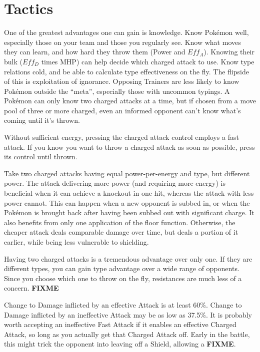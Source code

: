 \chapter{Tactics}
\label{chap:strategy}
One of the greatest advantages one can gain is knowledge.
Know Pokémon well, especially those on your team and those you regularly see.
Know what moves they can learn, and how hard they throw them (Power and $Eff_A$).
Knowing their bulk ($Eff_D$ times MHP) can help decide which charged attack to use.
Know type relations cold, and be able to calculate type effectiveness on the fly.
The flipside of this is exploitation of ignorance.
Opposing Trainers are less likely to know Pokémon outside the ``meta'',
 especially those with uncommon typings.
A Pokémon can only know two charged attacks at a time, but if
 chosen from a move pool of three or more charged, even an informed opponent
 can't know what's coming until it's thrown.

\begin{tipbox}[title=A tip regarding battle UI]
Without sufficient energy, pressing the charged attack control employs a fast attack.
If you know you want to throw a charged attack as soon as possible, press its control until thrown.
\end{tipbox}

Take two charged attacks having equal power-per-energy and type, but different power.
The attack delivering more power (and requiring more energy) is beneficial
 when it can achieve a knockout in one hit, whereas the attack with less power cannot.
This can happen when a new opponent is subbed in, or when the Pokémon is brought back
 after having been subbed out with significant charge.
It also benefits from only one application of the floor function.
Otherwise, the cheaper attack deals comparable damage over time, but deals a portion
 of it earlier, while being less vulnerable to shielding.

Having two charged attacks is a tremendous advantage over only one.
If they are different types, you can gain type advantage over a wide range of opponents.
Since you choose which one to throw on the fly, resistances are much less of a concern.
\textbf{FIXME}

Change to Damage inflicted by an effective Attack is at least 60\%.
Change to Damage inflicted by an ineffective Attack may be as
 low as 37.5\%.
It is probably worth accepting an ineffective Fast Attack if it
 enables an effective Charged Attack, so long as you actually
 get that Charged Attack off.
Early in the battle, this might trick the opponent into leaving
 off a Shield, allowing a \textbf{FIXME}.

